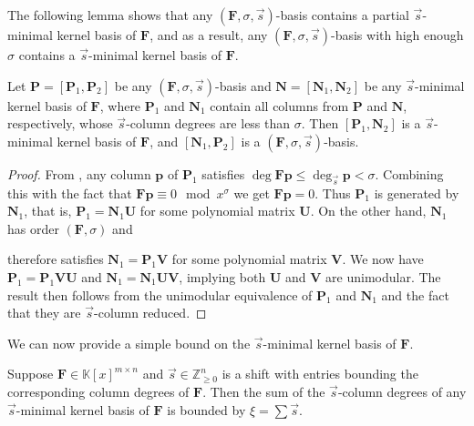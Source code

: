 The following lemma shows that any $(\mathbf{F},\sigma,\vec{s})$-basis
contains a partial $\vec{s}$-minimal kernel basis of $\mathbf{F}$,
and as a result, any $(\mathbf{F},\sigma,\vec{s})$-basis with high
enough $\sigma$ contains a $\vec{s}$-minimal kernel basis of $\mathbf{F}$. 
\begin{lem}
\label{lem:orderBasisContainsNullspaceBasis}Let $\mathbf{P}=\left[\mathbf{P}_{1},\mathbf{P}_{2}\right]$
be any $\left(\mathbf{F},\sigma,\vec{s}\right)$-basis and $\mathbf{N}=\left[\mathbf{N}_{1},\mathbf{N}_{2}\right]$
be any $\vec{s}$-minimal kernel basis of $\mathbf{F}$, where $\mathbf{P}_{1}$
and $\mathbf{N}_{1}$ contain all columns from $\mathbf{P}$ and $\mathbf{N}$,
respectively, whose $\vec{s}$-column degrees are less than $\sigma$.
Then $\left[\mathbf{P}_{1},\mathbf{N}_{2}\right]$ is a $\vec{s}$-minimal
kernel basis of $\mathbf{F}$, and $\left[\mathbf{N}_{1},\mathbf{P}_{2}\right]$
is a $\left(\mathbf{F},\sigma,\vec{s}\right)$-basis.\end{lem}
\begin{proof}
From , any column $\mathbf{p}$
of $\mathbf{P}_{1}$ satisfies $\deg\mathbf{F}\mathbf{p}\le\deg_{\vec{s}}\mathbf{p}<\sigma$.
Combining this with the fact that $\mathbf{F}\mathbf{p}\equiv0\mod x^{\sigma}$
we get $\mathbf{F}\mathbf{p}=0$. Thus $\mathbf{P}_{1}$ is generated
by $\mathbf{N}_{1}$, that is, $\mathbf{P}_{1}=\mathbf{N}_{1}\mathbf{U}$
for some polynomial matrix $\mathbf{U}$. On the other hand, $\mathbf{N}_{1}$
has order $\left(\mathbf{F},\sigma\right)$ and %
\begin{comment}
is therefore generated by $\mathbf{P}_{1}$, i.e. 
\end{comment}
{} therefore satisfies $\mathbf{N}_{1}=\mathbf{P}_{1}\mathbf{V}$ for
some polynomial matrix $\mathbf{V}$. We now have $\mathbf{P}_{1}=\mathbf{P}_{1}\mathbf{V}\mathbf{U}$
and $\mathbf{N}_{1}=\mathbf{N}_{1}\mathbf{U}\mathbf{V}$, implying
both $\mathbf{U}$ and $\mathbf{V}$ are unimodular. The result then
follows from the unimodular equivalence of $\mathbf{P}_{1}$ and $\mathbf{N}_{1}$
and the fact that they are $\vec{s}$-column reduced. %
\end{proof}
We can now provide a simple bound on the $\vec{s}$-minimal kernel
basis of $\mathbf{F}$. 
\begin{thm}
\label{thm:boundOfSumOfShiftedDegreesOfKernelBasis}Suppose $\mathbf{F}\in\mathbb{K}\left[x\right]^{m\times n}$
and $\vec{s}\in\mathbb{Z}_{\ge0}^{n}$ is a shift with entries bounding
the corresponding column degrees of $\mathbf{F}$. Then the sum of
the $\vec{s}$-column degrees of any $\vec{s}$-minimal kernel basis
of $\mathbf{F}$ is bounded by $\xi=\sum\vec{s}$.\end{thm}
